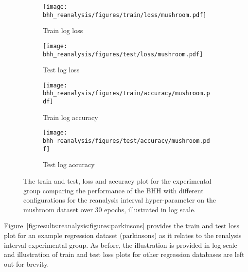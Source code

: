 \begin{figure}[htbp]
	\begin{subfigure}{0.5\textwidth}
		\centering
		\texttt{[image: bhh\_reanalysis/figures/train/loss/mushroom.pdf]}
		\caption{Train log loss}
		\label{fig:results:reanalysis:figures:loss:train:mushroom}
	\end{subfigure}
	\begin{subfigure}{0.5\textwidth}
		\centering
		\texttt{[image: bhh\_reanalysis/figures/test/loss/mushroom.pdf]}
		\caption{Test log loss}
		\label{fig:results:reanalysis:figures:loss:test:mushroom}
	\end{subfigure}
	\par\bigskip
	\begin{subfigure}{0.5\textwidth}
		\centering
		\texttt{[image: bhh\_reanalysis/figures/train/accuracy/mushroom.pdf]}
		\caption{Train log accuracy}
		\label{fig:results:reanalysis:figures:accuracy:train:mushroom}
	\end{subfigure}
	\begin{subfigure}{0.5\textwidth}
		\centering
		\texttt{[image: bhh\_reanalysis/figures/test/accuracy/mushroom.pdf]}
		\caption{Test log accuracy}
		\label{fig:results:reanalysis:figures:accuracy:test:mushroom}
	\end{subfigure}
	\par\bigskip
	\caption{The train and test, loss and accuracy plot for the experimental group comparing the performance of the \acs{BHH} with different configurations for the reanalysis interval hyper-parameter on the mushroom dataset over 30 epochs, illustrated in log scale.}
	\label{fig:results:reanalysis:figures:mushroom}
\end{figure}

Figure~\ref{fig:results:reanalysis:figures:parkinsons} provides the train and test loss plot for an example regression dataset (parkinsons) as it relates to the renalysis interval experimental group. As before, the illustration is provided in log scale and illustration of train and test loss plots for other regression databases are left out for brevity.

